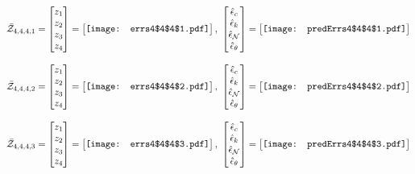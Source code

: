 \documentclass[12pt]{article}
\begin{document}
\begin{gather*}
\bar{\mathcal{Z}}_{4,4,4,1}=\begin{bmatrix}
z_1\\
z_2\\
z_3\\
z_4
 \end{bmatrix}= \begin{bmatrix}
\vcenter{\hbox{\texttt{[image: errs4\$4\$4\$1.pdf]}}}
 \end{bmatrix},\,\, \begin{bmatrix}
\hat{\epsilon}_c\\\hat{\epsilon}_k\\\hat{\epsilon}_\mathcal{N}\\\hat{\epsilon}_\theta
 \end{bmatrix}=\begin{bmatrix}
\vcenter{\hbox{\texttt{[image: predErrs4\$4\$4\$1.pdf]}}}
 \end{bmatrix}
\end{gather*}


\begin{gather*}
\bar{\mathcal{Z}}_{4,4,4,2}=\begin{bmatrix}
z_1\\
z_2\\
z_3\\
z_4
 \end{bmatrix}= \begin{bmatrix}
\vcenter{\hbox{\texttt{[image: errs4\$4\$4\$2.pdf]}}}
 \end{bmatrix},\,\, \begin{bmatrix}
\hat{\epsilon}_c\\\hat{\epsilon}_k\\\hat{\epsilon}_\mathcal{N}\\\hat{\epsilon}_\theta
 \end{bmatrix}=\begin{bmatrix}
\vcenter{\hbox{\texttt{[image: predErrs4\$4\$4\$2.pdf]}}}
 \end{bmatrix}
\end{gather*}


\begin{gather*}
\bar{\mathcal{Z}}_{4,4,4,3}=\begin{bmatrix}
z_1\\
z_2\\
z_3\\
z_4
 \end{bmatrix}= \begin{bmatrix}
\vcenter{\hbox{\texttt{[image: errs4\$4\$4\$3.pdf]}}}
 \end{bmatrix},\,\, \begin{bmatrix}
\hat{\epsilon}_c\\\hat{\epsilon}_k\\\hat{\epsilon}_\mathcal{N}\\\hat{\epsilon}_\theta
 \end{bmatrix}=\begin{bmatrix}
\vcenter{\hbox{\texttt{[image: predErrs4\$4\$4\$3.pdf]}}}
 \end{bmatrix}
\end{gather*}
\end{document}
